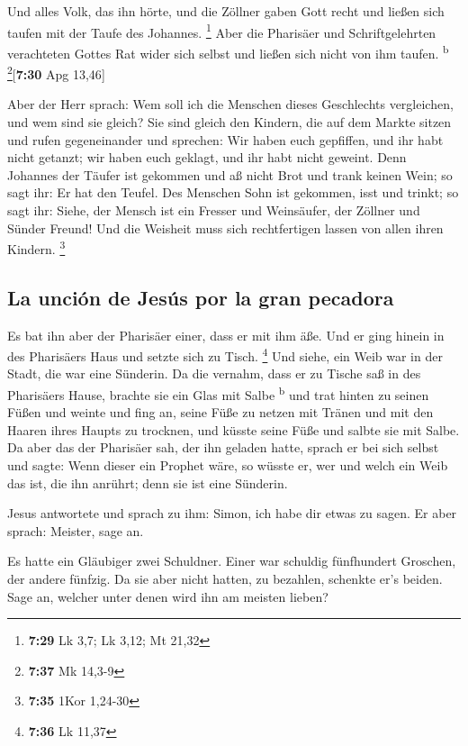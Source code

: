  Und alles Volk, das ihn hörte, und die Zöllner gaben
Gott recht und ließen sich taufen mit der Taufe des Johannes.
\footnote{\textbf{7:29} Lk 3,7; Lk 3,12; Mt 21,32}  Aber
die Pharisäer und Schriftgelehrten verachteten Gottes Rat wider sich
selbst und ließen sich nicht von ihm taufen. \textsuperscript{b}
\footnote{\textbf{7:37} Mk 14,3-9}{[}\textbf{7:30} Apg 13,46{]}

 Aber der Herr sprach: Wem soll ich die Menschen dieses
Geschlechts vergleichen, und wem sind sie gleich?  Sie
sind gleich den Kindern, die auf dem Markte sitzen und rufen
gegeneinander und sprechen: Wir haben euch gepfiffen, und ihr habt nicht
getanzt; wir haben euch geklagt, und ihr habt nicht geweint.
 Denn Johannes der Täufer ist gekommen und aß nicht Brot
und trank keinen Wein; so sagt ihr: Er hat den Teufel. 
Des Menschen Sohn ist gekommen, isst und trinkt; so sagt ihr: Siehe, der
Mensch ist ein Fresser und Weinsäufer, der Zöllner und Sünder Freund!
 Und die Weisheit muss sich rechtfertigen lassen von
allen ihren Kindern. \footnote{\textbf{7:35} 1Kor 1,24-30}

\hypertarget{la-unciuxf3n-de-jesuxfas-por-la-gran-pecadora}{%
\subsection{La unción de Jesús por la gran
pecadora}\label{la-unciuxf3n-de-jesuxfas-por-la-gran-pecadora}}

 Es bat ihn aber der Pharisäer einer, dass er mit ihm
äße. Und er ging hinein in des Pharisäers Haus und setzte sich zu Tisch.
\footnote{\textbf{7:36} Lk 11,37}  Und siehe, ein Weib
war in der Stadt, die war eine Sünderin. Da die vernahm, dass er zu
Tische saß in des Pharisäers Hause, brachte sie ein Glas mit Salbe
\textsuperscript{b}  und trat hinten zu seinen Füßen und
weinte und fing an, seine Füße zu netzen mit Tränen und mit den Haaren
ihres Haupts zu trocknen, und küsste seine Füße und salbte sie mit
Salbe.  Da aber das der Pharisäer sah, der ihn geladen
hatte, sprach er bei sich selbst und sagte: Wenn dieser ein Prophet
wäre, so wüsste er, wer und welch ein Weib das ist, die ihn anrührt;
denn sie ist eine Sünderin.

 Jesus antwortete und sprach zu ihm: Simon, ich habe dir
etwas zu sagen. Er aber sprach: Meister, sage an.

 Es hatte ein Gläubiger zwei Schuldner. Einer war
schuldig fünfhundert Groschen, der andere fünfzig.  Da
sie aber nicht hatten, zu bezahlen, schenkte er's beiden. Sage an,
welcher unter denen wird ihn am meisten lieben?


